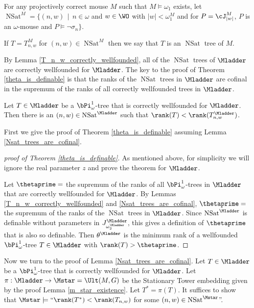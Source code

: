 \documentclass[oneside,12pt]{amsart}
\DeclareMathOperator{\NSat}{NSat}
\begin{document}
\begin{definition}
For any projectively correct mouse $M$ such that $M\models \omega_1$ exists,
let $\NSat^M=\big\{ (n,w) \, \mid \, n\in\omega$ and $w\in\WO$ with $|w|<\omega_1^{M}$ and
for $P=\cJ^M_{|w|}$, $P$ is an $\omega$-mouse and $P\models \neg \sigma_n \big\}$.

If $T=T^M_{n,w}$ for $(n,w)\in\NSat^M$ then we say that $T$ is an $\NSat$ tree of $M$.
\end{definition}

By Lemma \ref{T_n_w_correctly_wellfounded}, all of the $\NSat$ trees of $\Mladder$
are correctly wellfounded for $\Mladder$. The key to the proof of Theorem
 \ref{theta_is_definable} is that the ranks of the $\NSat$ trees in $\Mladder$ are cofinal
 in the supremum of the ranks of all correctly wellfounded trees in $\Mladder$.

\begin{lemma}
\label{Nsat_trees_are_cofinal}
Let $T\in\Mladder$ be a $\bPi^1_{\omega}$-tree that is correctly wellfounded for $\Mladder$.
Then there is an $(n,w)\in \NSat^{\Mladder}$ such that $\rank(T) < \rank(T^{\Mladder}_{n,w})$.
\end{lemma}

First we give the proof of Theorem \ref{theta_is_definable} assuming Lemma
\ref{Nsat_trees_are_cofinal}.

\begin{proof}[proof of Theorem \ref{theta_is_definable}]
As mentioned above, for simplicity we will ignore the real parameter $z$ and prove
the theorem for $\Mladder$.

Let $\thetaprime = $ the supremum of the ranks of all $\bPi^1_{\omega}$-trees
in $\Mladder$ that are correctly wellfounded for $\Mladder$. By Lemmas
\ref{T_n_w_correctly_wellfounded} and \ref{Nsat_trees_are_cofinal}, $\thetaprime =$
the supremum of the ranks of the $\NSat$ trees in $\Mladder$.
Since $\NSat^{\Mladder}$
is definable without parameters in $J^{\Mladder}_{\omega_2^{\Mladder}}$,
this gives a definition of $\thetaprime$ that is also
so definable. Then $\theta^{\Mladder}$ is the minimum rank of a wellfounded
$\bPi^1_{\omega}$-tree $T\in\Mladder$ with $\rank(T)>\thetaprime$.
\end{proof}



Now we turn to the proof of Lemma \ref{Nsat_trees_are_cofinal}.
Let $T\in\Mladder$ be a $\bPi^1_{\omega}$-tree that is correctly wellfounded for $\Mladder$.
Let $\pi:\Mladder\to\Mstar=\Ult(M,G)$ be the Stationary Tower embedding given by
the proof Lemma \ref{m_star_existence}. Let $T^* = \pi(T)$. It suffices to show that
$\Mstar\models\text{``}\rank(T^*) < \rank(T_{n,w})$ for some $(n,w)\in \NSat^{\Mstar}$''.
\end{document}
